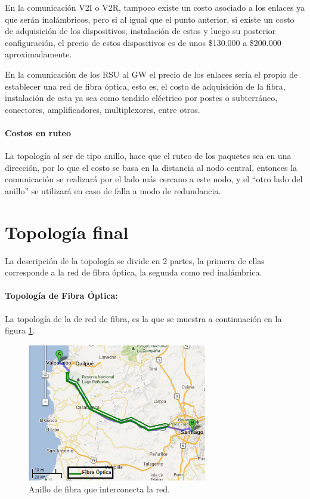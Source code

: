 \documentclass[12pt]{article}
\begin{document}
En la comunicación V2I o V2R, tampoco existe un costo asociado a los enlaces ya que serán inalámbricos, 
pero si al igual que el punto anterior, si existe un costo de adquisición de los dispositivos, 
instalación de estos y luego su posterior configuración, el precio de estos dispositivos es de unos 
\$130.000 a \$200.000 aproximadamente.

En la comunicación de los RSU al GW el precio de los enlaces sería el propio de establecer una red de 
fibra óptica, esto es, el costo de adquisición de la fibra, instalación de esta ya sea como tendido 
eléctrico por postes o subterráneo, conectores, amplificadores, multiplexores, entre otros.

\paragraph{Costos en ruteo}

La topología al ser de tipo anillo, hace que el ruteo de los paquetes sea en una dirección, por lo que 
el costo se basa en la distancia al nodo central, entonces la comunicación se realizará por el lado más 
cercano a este nodo, y el ``otro lado del anillo'' se utilizará en caso de falla a modo de redundancia.\\ 

\newpage
\section{Topología final}
La descripción de la topología se divide en 2 partes, la primera de ellas corresponde a la red de fibra 
óptica, la segunda como red inalámbrica.
\paragraph{Topología de Fibra Óptica:}
La topología de la de red de fibra, es la que se muestra a continuación en la figura \ref{fig:anillo_FO}.
\begin{figure}[H]
  \centering
      \includegraphics[width=0.7\textwidth]{anillo_FO}
	    \caption{Anillo de fibra que interconecta la red.}
	\label{fig:anillo_FO}
\end{figure}
\end{document}
